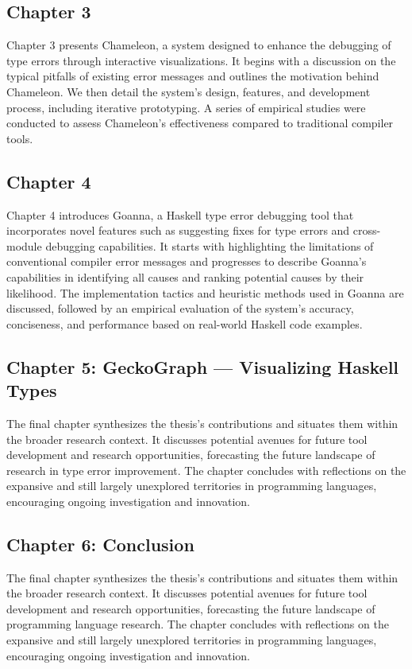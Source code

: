 \subsection{Chapter 3}
Chapter 3 presents Chameleon, a system designed to enhance the debugging of type errors through interactive visualizations. It begins with a discussion on the typical pitfalls of existing error messages and outlines the motivation behind Chameleon. We then detail the system's design, features, and development process, including iterative prototyping. A series of empirical studies were conducted to assess Chameleon's effectiveness compared to traditional compiler tools.
    
\subsection{Chapter 4}
Chapter 4 introduces Goanna, a Haskell type error debugging tool that incorporates novel features such as suggesting fixes for type errors and cross-module debugging capabilities. It starts with highlighting the limitations of conventional compiler error messages and progresses to describe Goanna's capabilities in identifying all causes and ranking potential causes by their likelihood. The implementation tactics and heuristic methods used in Goanna are discussed, followed by an empirical evaluation of the system's accuracy, conciseness, and performance based on real-world Haskell code examples.
    
\subsection{Chapter 5: GeckoGraph — Visualizing Haskell Types}
The final chapter synthesizes the thesis's contributions and situates them within the broader research context. It discusses potential avenues for future tool development and research opportunities, forecasting the future landscape of research in type error improvement. The chapter concludes with reflections on the expansive and still largely unexplored territories in programming languages, encouraging ongoing investigation and innovation.

    
\subsection{Chapter 6: Conclusion}
The final chapter synthesizes the thesis's contributions and situates them within the broader research context. It discusses potential avenues for future tool development and research opportunities, forecasting the future landscape of programming language research. The chapter concludes with reflections on the expansive and still largely unexplored territories in programming languages, encouraging ongoing investigation and innovation.